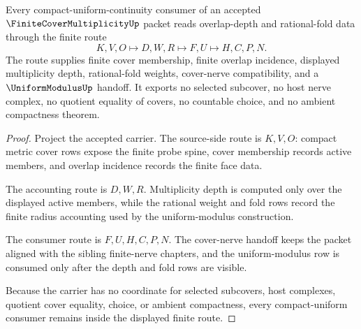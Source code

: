 \begin{theorem}
\label{thm:finite-cover-multiplicity-overlap-depth-handoff}
Every compact-uniform-continuity consumer of an accepted $\FiniteCoverMultiplicityUp$ packet reads overlap-depth and rational-fold data through the finite route
$$
K,V,O \longmapsto D,W,R \longmapsto F,U \longmapsto H,C,P,N .
$$
The route supplies finite cover membership, finite overlap incidence, displayed multiplicity depth, rational-fold weights, cover-nerve compatibility, and a $\UniformModulusUp$ handoff. It exports no selected subcover, no host nerve complex, no quotient equality of covers, no countable choice, and no ambient compactness theorem.
\end{theorem}
\begin{proof}
Project the accepted carrier. The source-side route is $K,V,O$: compact metric cover rows expose the finite probe spine, cover membership records active members, and overlap incidence records the finite face data.

The accounting route is $D,W,R$. Multiplicity depth is computed only over the displayed active members, while the rational weight and fold rows record the finite radius accounting used by the uniform-modulus construction.

The consumer route is $F,U,H,C,P,N$. The cover-nerve handoff keeps the packet aligned with the sibling finite-nerve chapters, and the uniform-modulus row is consumed only after the depth and fold rows are visible.

Because the carrier has no coordinate for selected subcovers, host complexes, quotient cover equality, choice, or ambient compactness, every compact-uniform consumer remains inside the displayed finite route.
\end{proof}

\begin{closurestatus}{\FiniteCoverMultiplicityUp}
  \theoryclosure{\seedClosure}
  \formalstatus{\unformalizedV}
\end{closurestatus}
